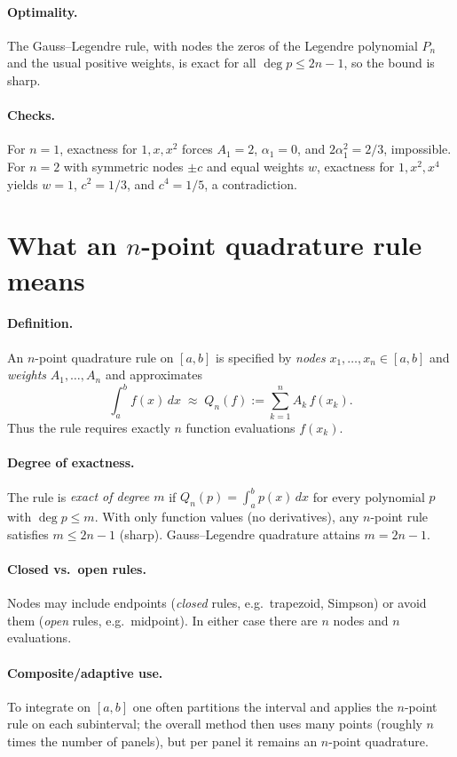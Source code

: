 \documentclass[11pt,a4paper]{article}
\theoremstyle{definition}
\theoremstyle{definition}
\theoremstyle{plain}
\theoremstyle{remark}
\begin{document}
\paragraph{Optimality.}
The Gauss--Legendre rule, with nodes the zeros of the Legendre polynomial $P_n$
and the usual positive weights, is exact for all $\deg p\le 2n-1$, so the bound is sharp.

\paragraph{Checks.}
For $n=1$, exactness for $1,x,x^2$ forces $A_1=2$, $\alpha_1=0$, and $2\alpha_1^2=2/3$, impossible.
For $n=2$ with symmetric nodes $\pm c$ and equal weights $w$, exactness for $1,x^2,x^4$ yields
$w=1$, $c^2=1/3$, and $c^4=1/5$, a contradiction.


\section*{What an \(n\)-point quadrature rule means}

\paragraph{Definition.}
An \(n\)-point quadrature rule on \([a,b]\) is specified by \emph{nodes}
\(x_1,\dots,x_n\in[a,b]\) and \emph{weights} \(A_1,\dots,A_n\) and approximates
\[
\int_a^b f(x)\,dx \;\approx\; Q_n(f):=\sum_{k=1}^{n} A_k\,f(x_k).
\]
Thus the rule requires exactly \(n\) function evaluations \(f(x_k)\).

\paragraph{Degree of exactness.}
The rule is \emph{exact of degree \(m\)} if \(Q_n(p)=\int_a^b p(x)\,dx\) for every polynomial
\(p\) with \(\deg p\le m\).
With only function values (no derivatives), any \(n\)-point rule satisfies \(m\le 2n-1\) (sharp).
Gauss--Legendre quadrature attains \(m=2n-1\).

\paragraph{Closed vs.\ open rules.}
Nodes may include endpoints (\emph{closed} rules, e.g.\ trapezoid, Simpson) or avoid them
(\emph{open} rules, e.g.\ midpoint). In either case there are \(n\) nodes and \(n\) evaluations.

\paragraph{Composite/adaptive use.}
To integrate on \([a,b]\) one often partitions the interval and applies the \(n\)-point rule on each
subinterval; the overall method then uses many points (roughly \(n\) times the number of panels),
but per panel it remains an \(n\)-point quadrature.
\end{document}
